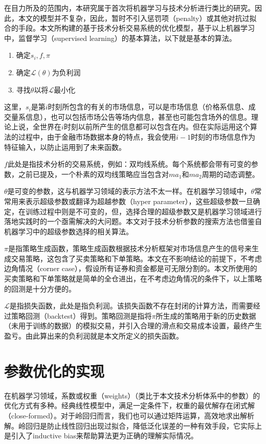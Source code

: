 \documentclass[twoside,longtitle]{LZUthesis}
\begin{document}
在目力所及的范围内，本研究属于首次将机器学习与技术分析进行类比的研究。因此，本文的模型并不复杂，因此，暂时不引入惩罚项（penalty）或其他对抗过拟合的手段。本文所构建的基于技术分析交易系统的优化模型，基于以上机器学习中，监督学习（supervised learning）的基本算法，以下就是基本的算法。
\begin{enumerate}
	\item 确定$ s_i, f, \pi $
	\item 确定$\mathcal{L}(\theta)$为负利润
	\item 寻找$\theta$以将$\mathcal{L}$最小化
\end{enumerate}
这里，$ s_i $是第$i$时刻所包含的有关的市场信息，可以是市场信息（价格系信息、成交量系信息），也可以包括市场公告等场内信息，甚至也可能包含场外的信息。理论上说，全世界在$i$时刻以前所产生的信息都可以包含在内。但在实际运用这个算法的过程中，由于金融市场数据本身的特点，我会使用$i-1$时刻的市场信息作为特征输入，以防止运用到了未来函数。

$f$此处是指技术分析的交易系统，例如：双均线系统。每个系统都会带有可变的参数，之前已提及，一个朴素的双均线策略应当包含对$ma_1$和$ma_2$周期的动态调整。

$\theta$是可变的参数，这与机器学习领域的表示方法不太一样。在机器学习领域中，$\theta$常常用来表示超级参数或翻译为超越参数（hyper parameter），这些超级参数一旦确定，在训练过程中则是不可变的，但，选择合理的超级参数又是机器学习领域进行落地实践时的一个亟需解决的大问题。本文对于技术分析参数的搜索方法也借鉴自机器学习中的超级参数选择的相关算法。

$\pi$是指策略生成函数，策略生成函数根据技术分析框架对市场信息产生的信号来生成交易策略，这包含了买卖策略和下单策略。本文在不影响结论的前提下，不考虑边角情况（corner case），假设所有证券和资金都是可无限分割的。本文所使用的买卖策略和下单策略就是简单的全仓进出，在不考虑边角情况的条件下，以上策略的回测是十分方便的。

$\mathcal{L}$是指损失函数，此处是指负利润。该损失函数不存在封闭的计算方法，而需要经过策略回测（backtest）得到。策略回测是指将$\pi$所生成的策略用于新的历史数据（未用于训练的数据）的模拟交易，并引入合理的滑点和交易成本设置，最终产生盈亏。由此算出来的负利润就是本文所定义的损失函数。

\section{参数优化的实现}
在机器学习领域，系数或权重（weights）（类比于本文技术分析体系中的参数）的优化方式有多种。经典线性模型中，满足一定条件下，权重的最优解存在闭式解（close-formed）。对于岭回归而言，我们也可以通过矩阵运算，高效地求出解析解。岭回归是防止线性回归出现过拟合，降低泛化误差的一种有效手段，它实际上是引入了inductive bias来帮助算法更为正确的理解实际情况。
\end{document}
